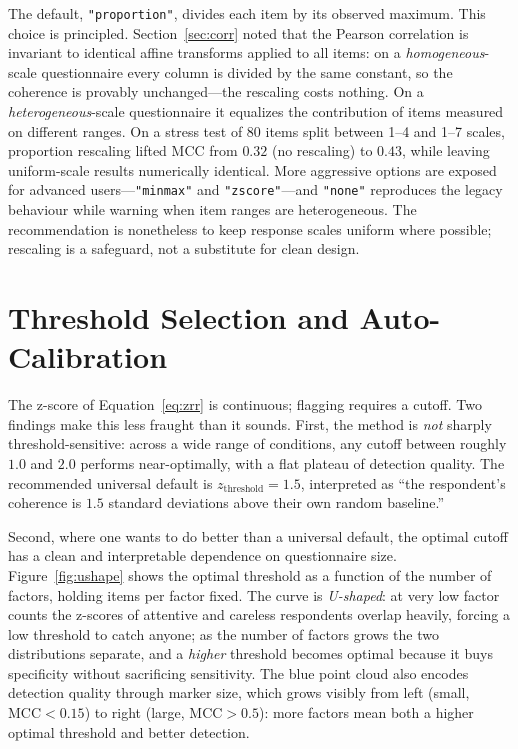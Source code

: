 The default, \texttt{"proportion"}, divides each item by its observed maximum.
This choice is principled. Section~\ref{sec:corr} noted that the Pearson correlation is
invariant to identical affine transforms applied to all items: on a
\emph{homogeneous}-scale questionnaire every column is divided by the same
constant, so the coherence is provably unchanged---the rescaling costs nothing.
On a \emph{heterogeneous}-scale questionnaire it equalizes the contribution of
items measured on different ranges. On a stress test of 80 items split between
1--4 and 1--7 scales, proportion rescaling lifted MCC from $0.32$ (no rescaling)
to $0.43$, while leaving uniform-scale results numerically identical. More
aggressive options are exposed for advanced users---\texttt{"minmax"} and
\texttt{"zscore"}---and \texttt{"none"} reproduces the legacy behaviour while
warning when item ranges are heterogeneous. The recommendation is nonetheless to
keep response scales uniform where possible; rescaling is a safeguard, not a
substitute for clean design.

\section{Threshold Selection and Auto-Calibration}

The z-score of Equation~\ref{eq:zrr} is continuous; flagging requires a cutoff.
Two findings make this less fraught than it sounds. First, the method is
\emph{not} sharply threshold-sensitive: across a wide range of conditions, any
cutoff between roughly $1.0$ and $2.0$ performs near-optimally, with a flat
plateau of detection quality. The recommended universal default is
$z_{\text{threshold}} = 1.5$, interpreted as ``the respondent's coherence is
$1.5$ standard deviations above their own random baseline.''

Second, where one wants to do better than a universal default, the optimal cutoff
has a clean and interpretable dependence on questionnaire size. Figure~\ref{fig:ushape}
shows the optimal threshold as a function of the number of factors, holding
items per factor fixed. The curve is \emph{U-shaped}: at very low factor counts
the z-scores of attentive and careless respondents overlap heavily, forcing a
low threshold to catch anyone; as the number of factors grows the two
distributions separate, and a \emph{higher} threshold becomes optimal because it
buys specificity without sacrificing sensitivity. The blue point cloud also
encodes detection quality through marker size, which grows visibly from left
(small, $\text{MCC} < 0.15$) to right (large, $\text{MCC} > 0.5$): more factors
mean both a higher optimal threshold and better detection.

